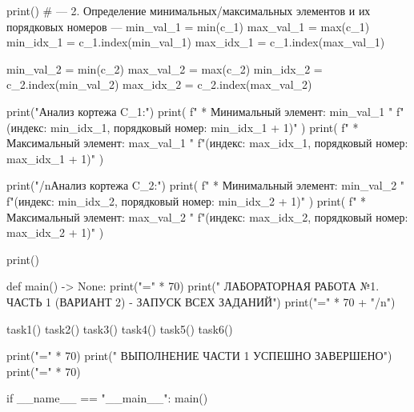 \documentclass[14pt,a4paper]{extarticle}
\begin{document}
\begin{CodeListing}
    print()
    # --- 2. Определение минимальных/максимальных элементов и их порядковых номеров ---
    min_val_1 = min(c_1)
    max_val_1 = max(c_1)
    min_idx_1 = c_1.index(min_val_1)
    max_idx_1 = c_1.index(max_val_1)

    min_val_2 = min(c_2)
    max_val_2 = max(c_2)
    min_idx_2 = c_2.index(min_val_2)
    max_idx_2 = c_2.index(max_val_2)

    print("Анализ кортежа C_1:")
    print(
        f"  * Минимальный элемент: {min_val_1} "
        f"(индекс: {min_idx_1}, порядковый номер: {min_idx_1 + 1})"
    )
    print(
        f"  * Максимальный элемент: {max_val_1} "
        f"(индекс: {max_idx_1}, порядковый номер: {max_idx_1 + 1})"
    )

    print("/nАнализ кортежа C_2:")
    print(
        f"  * Минимальный элемент: {min_val_2} "
        f"(индекс: {min_idx_2}, порядковый номер: {min_idx_2 + 1})"
    )
    print(
        f"  * Максимальный элемент: {max_val_2} "
        f"(индекс: {max_idx_2}, порядковый номер: {max_idx_2 + 1})"
    )

    print()


def main() -> None:
    print("=" * 70)
    print("  ЛАБОРАТОРНАЯ РАБОТА №1. ЧАСТЬ 1 (ВАРИАНТ 2) - ЗАПУСК ВСЕХ ЗАДАНИЙ")
    print("=" * 70 + "/n")

    task1()
    task2()
    task3()
    task4()
    task5()
    task6()

    print("=" * 70)
    print("  ВЫПОЛНЕНИЕ ЧАСТИ 1 УСПЕШНО ЗАВЕРШЕНО")
    print("=" * 70)


if __name__ == "__main__":
    main()
\end{CodeListing}
\end{document}
